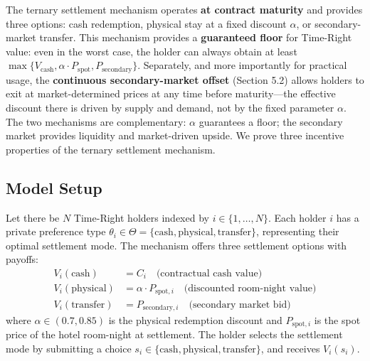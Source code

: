 \documentclass[12pt,a4paper]{article}
\begin{document}
The ternary settlement mechanism operates \textbf{at contract maturity} and provides three options: cash redemption, physical stay at a fixed discount $\alpha$, or secondary-market transfer.
This mechanism provides a \textbf{guaranteed floor} for Time-Right value: even in the worst case, the holder can always obtain at least $\max\{V_{\text{cash}}, \alpha \cdot P_{\text{spot}}, P_{\text{secondary}}\}$.
Separately, and more importantly for practical usage, the \textbf{continuous secondary-market offset} (Section 5.2) allows holders to exit at market-determined prices at any time before maturity---the effective discount there is driven by supply and demand, not by the fixed parameter $\alpha$.
The two mechanisms are complementary: $\alpha$ guarantees a floor; the secondary market provides liquidity and market-driven upside.
We prove three incentive properties of the ternary settlement mechanism.

\subsection{Model Setup}

Let there be $N$ Time-Right holders indexed by $i \in \{1, \ldots, N\}$.
Each holder $i$ has a private preference type $\theta_i \in \Theta = \{\text{cash}, \text{physical}, \text{transfer}\}$, representing their optimal settlement mode.
The mechanism offers three settlement options with payoffs:
\begin{align}
    V_i(\text{cash})      &= C_i \quad \text{(contractual cash value)} \label{eq:vcash} \\
    V_i(\text{physical})  &= \alpha \cdot P_{\text{spot}, i} \quad \text{(discounted room-night value)} \\
    V_i(\text{transfer})  &= P_{\text{secondary}, i} \quad \text{(secondary market bid)}
\end{align}
where $\alpha \in (0.7, 0.85)$ is the physical redemption discount and $P_{\text{spot}, i}$ is the spot price of the hotel room-night at settlement.
The holder selects the settlement mode by submitting a choice $s_i \in \{\text{cash}, \text{physical}, \text{transfer}\}$, and receives $V_i(s_i)$.
\end{document}
